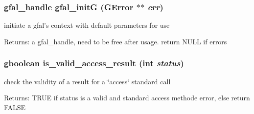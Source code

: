 \subsubsection{\setlength{\rightskip}{0pt plus 5cm}gfal\_\-handle gfal\_\-init\-G (GError $\ast$$\ast$ {\em err})}\label{gfal__common__all_8c_8410ba458f920d8f8a8f0e5594170fe4}


initiate a gfal's context with default parameters for use \begin{Desc}
\item[Returns:]a gfal\_\-handle, need to be free after usage. return NULL if errors \end{Desc}
\subsubsection{\setlength{\rightskip}{0pt plus 5cm}gboolean is\_\-valid\_\-access\_\-result (int {\em status})}\label{gfal__common__all_8c_aed64917ebc1c60ab8ccd2c4dfbd2c3a}


check the validity of a result for a \char`\"{}access\char`\"{} standard call \begin{Desc}
\item[Returns:]TRUE if status is a valid and standard access methode error, else return FALSE \end{Desc}

